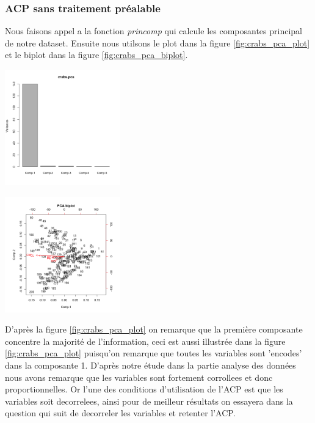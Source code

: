 \documentclass[10pt]{article}
\begin{document}
	\subsubsection{ACP sans traitement préalable}
	Nous faisons appel a la fonction \textit{princomp }qui calcule les composantes principal de notre dataset. Ensuite nous utilsons le plot dans la figure \ref{fig:crabs_pca_plot} et le biplot dans la figure \ref{fig:crabs_pca_biplot}.\\
	\begin{minipage}{.5\textwidth}
		\centering
		\includegraphics[width=50mm]{Figures/Crabs/pca_plot.png}
		\label{fig:crabs_pca_plot}
	\end{minipage}%
	\hspace{0.08\linewidth}
	\begin{minipage}{.5\textwidth}
		\centering
		\includegraphics[width=50mm]{Figures/Crabs/pca_biplot.png}
		\label{fig:crabs_pca_biplot}
	\end{minipage}
	\vspace{2mm}
	
	D'après la figure \ref{fig:crabs_pca_plot} on remarque que la première composante concentre la majorité de l'information, ceci est aussi illustrée dans la figure \ref{fig:crabs_pca_plot} puisqu'on remarque que toutes les variables sont 'encodes' dans la composante 1. D'après notre étude dans la partie analyse des données nous avons remarque que les variables sont fortement corrollees et donc proportionnelles. Or l'une des conditions d'utilisation de l'ACP est que les variables soit decorrelees, ainsi pour de meilleur résultats on essayera dans la question qui suit de decorreler les variables et retenter l'ACP.
	
\end{document}
